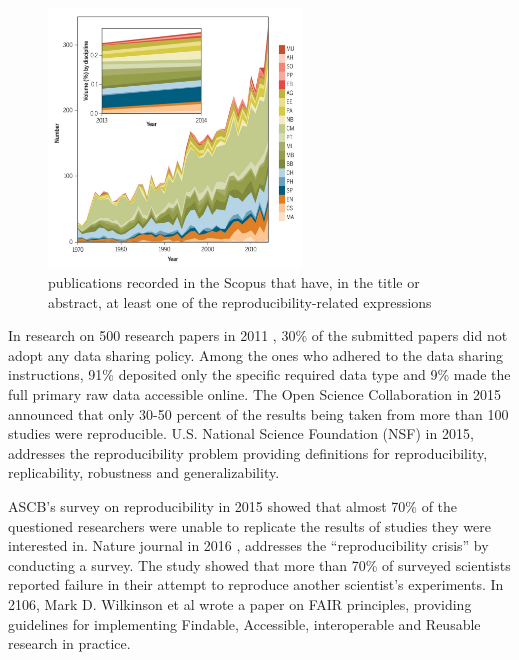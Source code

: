 \begin{figure}[ht]
    \centering
    \includegraphics[width=0.60\textwidth]{figures/03ReproducibilityPubTimeline.jpg}
    \caption{ publications recorded in the Scopus that have, in the title or abstract, 
    at least one of the reproducibility-related expressions \cite{goodman_what_2016}}
    \label{fig:publications}
\end{figure}

In research on 500 research papers in 2011 \cite{alsheikh-ali_public_2011},  30\% of the submitted papers did not adopt 
any data sharing policy. Among the ones who adhered to the data sharing instructions, 91\% deposited only the 
specific required data type and 9\% made the full primary raw data accessible online. The Open Science Collaboration 
in 2015 \cite{open_science_collaboration_estimating_2015} announced that only 30-50 percent of the results being taken 
from more than 100 studies were reproducible. U.S. National Science Foundation (NSF) \cite{cacioppo_social_2015} in 2015, 
addresses the reproducibility problem providing definitions for reproducibility, replicability, robustness and generalizability.  

ASCB’s survey on reproducibility in 2015 \cite{ascb_ascb_2015} showed that almost 70\% of the questioned researchers 
were unable to replicate the results of studies they were interested in. Nature journal in 2016 \cite{baker_1500_2016}, 
addresses the “reproducibility crisis” by conducting a survey. The study showed that more than 70\% of surveyed 
scientists reported failure in their attempt to reproduce another scientist's experiments.  In 2106, Mark D. Wilkinson et al 
\cite{wilkinson_fair_2016} wrote a paper on FAIR principles, providing guidelines for implementing Findable, 
Accessible, interoperable and Reusable research in practice.

